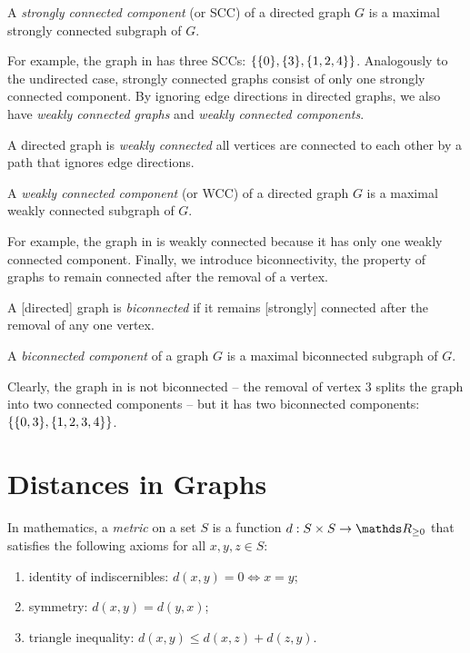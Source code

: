 \begin{definition}
A \emph{strongly connected component} (or SCC) of a directed graph $G$ is a
maximal strongly connected subgraph of $G$.
\end{definition}

For example, the graph in  has three SCCs:
$\set{\set{0}, \set{3},\set{1, 2, 4}}$. Analogously to the undirected case,
strongly connected graphs consist of only one strongly connected component.
By ignoring edge directions in directed graphs, we also have \emph{weakly connected graphs}
and \emph{weakly connected components}.

\begin{definition}
A directed graph is \emph{weakly connected} all vertices are connected to each
other by a path that ignores edge directions.
\end{definition}

\begin{definition}
A \emph{weakly connected component} (or WCC) of a directed graph $G$ is a
maximal weakly connected subgraph of $G$.
\end{definition}

For example, the graph in  is weakly connected because
it has only one weakly connected component.
%
Finally, we introduce biconnectivity, \ie the property of graphs to remain
connected after the removal of a vertex.

\begin{definition}
A [directed] graph is \emph{biconnected} if it remains [strongly] connected
after the removal of any one vertex.
\end{definition}

\begin{definition}
A \emph{biconnected component} of a graph $G$ is a
maximal biconnected subgraph of $G$.
\end{definition}

Clearly, the graph in  is not biconnected --
the removal of vertex 3 splits the graph into two connected components --
but it has two biconnected components: $\set{\set{0, 3}, \set{1, 2, 3, 4}}$.


%
\section{Distances in Graphs}
\label{sec:distances-in-graphs}
In mathematics, a \emph{metric} on a set $S$ is a function $d : S \times S \rightarrow \real_{\ge 0}$
that satisfies the following axioms for all $x, y, z \in S$:
\begin{enumerate}
    \item identity of indiscernibles: $d(x, y) = 0 \iff x = y$;
    \item symmetry: $d(x, y) = d(y, x)$;
    \item triangle inequality: $d(x, y) \le d(x, z) + d(z, y)$.
\end{enumerate}

